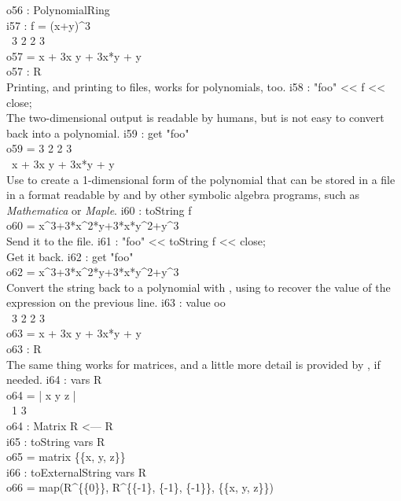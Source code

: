 \emptyLine
o56 : PolynomialRing\\
\endOutput
{}%
\beginOutput
i57 : f = (x+y)^3\\
\emptyLine
\       3     2        2    3\\
o57 = x  + 3x y + 3x*y  + y\\
\emptyLine
o57 : R\\
\endOutput
Printing, and printing to files, works for polynomials,
too.%
\beginOutput
i58 : "foo" << f << close;\\
\endOutput
The two-dimensional output is readable by humans, but is not easy to convert
back into a polynomial.
\beginOutput
i59 : get "foo"\\
\emptyLine
o59 =  3     2        2    3\\
\      x  + 3x y + 3x*y  + y\\
\endOutput
Use  to create a 1-dimensional form of the polynomial
that can be stored in a file in a format readable by \Mtwo and by other
symbolic algebra programs, such as {\em Mathematica} or {\em Maple}.
\beginOutput
i60 : toString f\\
\emptyLine
o60 = x^3+3*x^2*y+3*x*y^2+y^3\\
\endOutput
Send it to the file.
\beginOutput
i61 : "foo" << toString f << close;\\
\endOutput
Get it back.
\beginOutput
i62 : get "foo"\\
\emptyLine
o62 = x^3+3*x^2*y+3*x*y^2+y^3\\
\endOutput
Convert the string back to a polynomial with , using  to
recover the value of the expression on the previous line.
\beginOutput
i63 : value oo\\
\emptyLine
\       3     2        2    3\\
o63 = x  + 3x y + 3x*y  + y\\
\emptyLine
o63 : R\\
\endOutput
The same thing works for matrices, and a little more detail is provided by
, if needed.
\beginOutput
i64 : vars R\\
\emptyLine
o64 = | x y z |\\
\emptyLine
\              1       3\\
o64 : Matrix R  <--- R\\
\endOutput
\beginOutput
i65 : toString vars R\\
\emptyLine
o65 = matrix \{\{x, y, z\}\}\\
\endOutput
\beginOutput
i66 : toExternalString vars R\\
\emptyLine
o66 = map(R^\{\{0\}\}, R^\{\{-1\}, \{-1\}, \{-1\}\}, \{\{x, y, z\}\})\\
\endOutput


